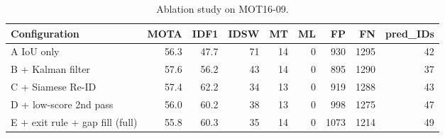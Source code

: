 \begin{table}[h]
\caption{Ablation study on MOT16-09.}
\label{tab:ablation}
\begin{tabular}{lrrrrrrrr}
\toprule
Configuration & MOTA & IDF1 & IDSW & MT & ML & FP & FN & pred_IDs \\
\midrule
A  IoU only & 56.3 & 47.7 & 71 & 14 & 0 & 930 & 1295 & 42 \\
B  + Kalman filter & 57.6 & 56.2 & 43 & 14 & 0 & 895 & 1290 & 37 \\
C  + Siamese Re-ID & 57.4 & 62.2 & 34 & 13 & 0 & 919 & 1288 & 43 \\
D  + low-score 2nd pass & 56.0 & 60.2 & 38 & 13 & 0 & 998 & 1275 & 47 \\
E  + exit rule + gap fill (full) & 55.8 & 60.3 & 35 & 14 & 0 & 1073 & 1214 & 49 \\
\bottomrule
\end{tabular}
\end{table}
